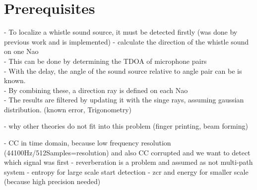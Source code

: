 \chapter{Prerequisites}

- To localize a whistle sound source, it must be detected firstly (was done by previous work
and is implemented)
- calculate the direction of the whistle sound on one Nao\\
- This can be done by determining the \ac{TDOA} of microphone pairs\\
- With the delay, the angle of the sound source relative to angle pair
can be is known.\\
- By combining these, a direction ray is defined on each Nao\\
- The results are filtered by updating it with the singe rays, assuming
gaussian distribution. (known error, Trigonometry)

- why other theories do not fit into this problem
(finger printing, beam forming)

- CC in time domain, because low frequency resolution (44100Hz/512Samples=resolution)
and also \ac{CC} corrupted and we want to detect which signal was first
- reverberation is a problem and assumed as not multi-path system
- entropy for large scale start detection
- zcr and energy for smaller scale (because high precision needed)







%
%

%
